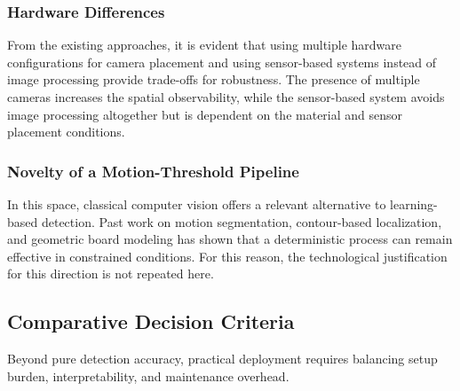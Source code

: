 \subsubsection{Hardware Differences}

From the existing approaches, it is evident that using multiple hardware configurations for camera placement and using sensor-based systems instead of image processing provide trade-offs for robustness. The presence of multiple cameras increases the spatial observability, while the sensor-based system avoids image processing altogether but is dependent on the material and sensor placement conditions.

\subsubsection{Novelty of a Motion-Threshold Pipeline}

In this space, classical computer vision offers a relevant alternative to learning-based detection. Past work on motion segmentation, contour-based localization, and geometric board modeling has shown that a deterministic process can remain effective in constrained conditions. For this reason, the technological justification for this direction is not repeated here.

\subsection{Comparative Decision Criteria}

Beyond pure detection accuracy, practical deployment requires balancing setup burden, interpretability, and maintenance overhead.

